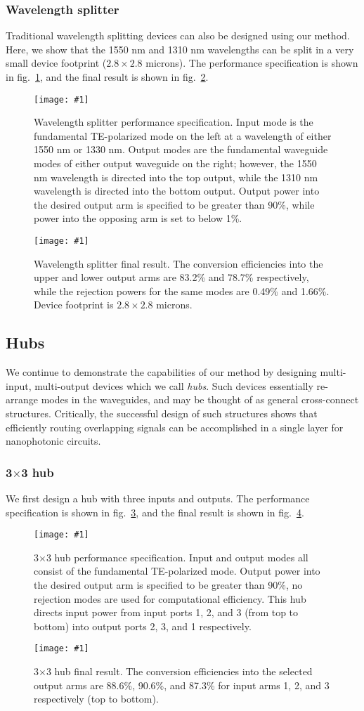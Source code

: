 \documentclass[letterpaper,10pt]{article}
\newcommand{\myfig}[2]{
    \begin{figure}[!h]
    \begin{centering}
    \texttt{[image: \#1]}
    \caption{#2}\label{#1}
    \end{centering}
    \end{figure}
}
\newcommand{\fig}[1]{fig.~\ref{#1}}
\begin{document}
\subsubsection{Wavelength splitter}
Traditional wavelength splitting devices can also be designed using our method.
Here, we show that the 1550 nm and 1310 nm wavelengths can be split
    in a very small device footprint ($2.8\times2.8$ microns).
The performance specification is shown in \fig{3Db_spl_wdm}, 
    and the final result is shown in \fig{spl_wdm}.
\myfig{3Db_spl_wdm}
    {Wavelength splitter performance specification.
    Input mode is the fundamental TE-polarized mode on the left at 
        a wavelength of either 1550 nm or 1330 nm.
    Output modes are the fundamental waveguide modes of either output 
        waveguide on the right;
        however, the 1550 nm wavelength is directed into the top output, 
        while the 1310 nm wavelength is directed into the bottom output.
    Output power into the desired output arm is specified to be greater than 90\%,
        while power into the opposing arm is set to below 1\%.}
\myfig{spl_wdm}
    {Wavelength splitter final result.
    The conversion efficiencies into the upper and lower output arms
        are 83.2\% and 78.7\% respectively, 
        while the rejection powers for the same modes are 0.49\% and 1.66\%.
    Device footprint is $2.8\times2.8$ microns.}

\subsection{Hubs}
We continue to demonstrate the capabilities of our method
    by designing multi-input, multi-output devices which we call \emph{hubs}.
Such devices essentially re-arrange modes in the waveguides,
    and may be thought of as general cross-connect structures.
Critically, the successful design of such structures 
    shows that efficiently routing overlapping signals can be 
    accomplished in a single layer for nanophotonic circuits.

\subsubsection{3$\times$3 hub}
We first design a hub with three inputs and outputs.
The performance specification is shown in \fig{3Db_hub_3x3},
    and the final result is shown in \fig{hub_3x3}.

\myfig{3Db_hub_3x3}
    {3$\times$3 hub performance specification.
    Input and output modes all consist of the fundamental TE-polarized mode.
    Output power into the desired output arm is specified to be greater than 90\%,
        no rejection modes are used for computational efficiency.
    This hub directs input power from input ports 1, 2, and 3 (from top to bottom)
    into output ports 2, 3, and 1 respectively.}
\myfig{hub_3x3}
    {3$\times$3 hub final result.
    The conversion efficiencies into the selected output arms
        are 88.6\%, 90.6\%, and 87.3\% for 
        input arms 1, 2, and 3 respectively (top to bottom).}
\end{document}
